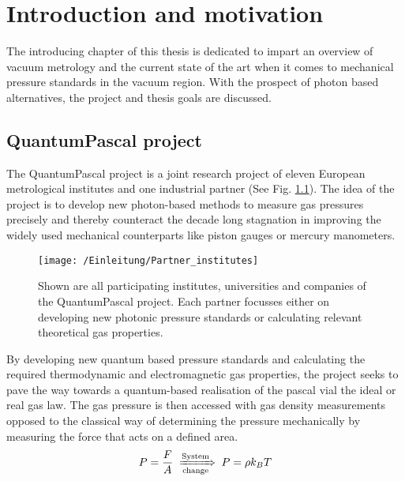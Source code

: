 
\chapter{Introduction and motivation}
The introducing chapter of this thesis is dedicated to impart an overview of vacuum metrology and the current state of the art when it comes to mechanical pressure standards in the vacuum region. With the prospect of photon based alternatives, the project and thesis goals are discussed.
 \section{QuantumPascal project}
The QuantumPascal project is a joint research project of eleven European metrological institutes and one industrial partner (See Fig. \ref{Parnter_institutes}). The idea of the project is to develop new photon-based methods to measure gas pressures precisely and thereby counteract the decade long stagnation in improving the widely used mechanical counterparts like piston gauges or mercury manometers.
\begin{figure}[H]
	\centering
	\texttt{[image: /Einleitung/Partner\_institutes]}
	\caption{Shown are all participating institutes, universities and companies of the QuantumPascal project. Each partner focusses either on developing new photonic pressure standards or calculating relevant theoretical gas properties. }
	\label{Parnter_institutes}
\end{figure}
\noindent
 By developing new quantum based pressure standards and calculating the required thermodynamic and electromagnetic gas properties, the project seeks to pave the way towards a quantum-based realisation of the pascal vial the ideal or real gas law. The gas pressure is then accessed with gas density measurements opposed to the classical way of determining the pressure mechanically by measuring the force that acts on a defined area.
 \begin{equation}
 P= \frac{F}{A} \; \xRightarrow[\text{change}]{\text{System}} \; P = \rho k_B T
 \label{System_change}
 \end{equation}
